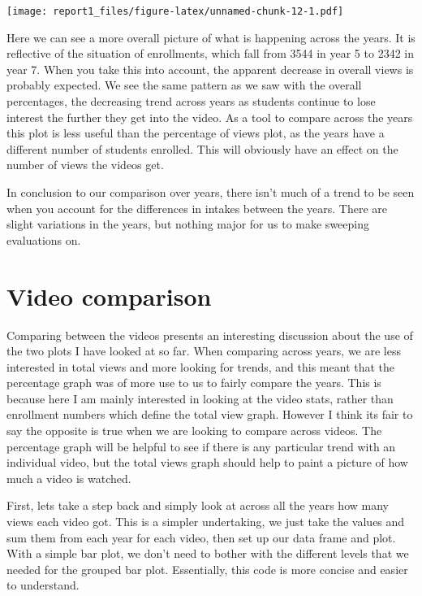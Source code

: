 \documentclass[
]{article}
\begin{document}
\texttt{[image: report1\_files/figure-latex/unnamed-chunk-12-1.pdf]}

Here we can see a more overall picture of what is happening across the
years. It is reflective of the situation of enrollments, which fall from
3544 in year 5 to 2342 in year 7. When you take this into account, the
apparent decrease in overall views is probably expected. We see the same
pattern as we saw with the overall percentages, the decreasing trend
across years as students continue to lose interest the further they get
into the video. As a tool to compare across the years this plot is less
useful than the percentage of views plot, as the years have a different
number of students enrolled. This will obviously have an effect on the
number of views the videos get.

In conclusion to our comparison over years, there isn't much of a trend
to be seen when you account for the differences in intakes between the
years. There are slight variations in the years, but nothing major for
us to make sweeping evaluations on.

\hypertarget{video-comparison}{%
\section{Video comparison}\label{video-comparison}}

Comparing between the videos presents an interesting discussion about
the use of the two plots I have looked at so far. When comparing across
years, we are less interested in total views and more looking for
trends, and this meant that the percentage graph was of more use to us
to fairly compare the years. This is because here I am mainly interested
in looking at the video stats, rather than enrollment numbers which
define the total view graph. However I think its fair to say the
opposite is true when we are looking to compare across videos. The
percentage graph will be helpful to see if there is any particular trend
with an individual video, but the total views graph should help to paint
a picture of how much a video is watched.

First, lets take a step back and simply look at across all the years how
many views each video got. This is a simpler undertaking, we just take
the values and sum them from each year for each video, then set up our
data frame and plot. With a simple bar plot, we don't need to bother
with the different levels that we needed for the grouped bar plot.
Essentially, this code is more concise and easier to understand.
\end{document}
